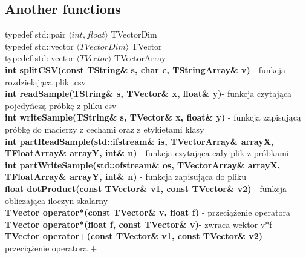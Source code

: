 \documentclass[11pt]{article}
\begin{document}
\subsection{Another functions}
typedef std::pair $\langle int, float \rangle$ TVectorDim\\
typedef std::vector $\langle TVectorDim \rangle$ TVector\\
typedef std::vector $\langle TVector \rangle$ TVectorArray\\
\textbf{int splitCSV(const TString\& s, char c, TStringArray\& v)} - funkcja rozdzielająca plik .csv\\
\textbf{int readSample(TString\& s, TVector\& x, float\& y)}- funkcja czytająca pojedyńczą próbkę z pliku csv\\
\textbf{int writeSample(TString\& s, TVector\& x, float\& y)} - funkcja zapisującą próbkę do macierzy z cechami oraz z etykietami klasy\\
\textbf{int partReadSample(std::ifstream\& is, TVectorArray\& arrayX, TFloatArray\& arrayY, int\& n) }- funkcja czytająca cały plik z próbkami\\
\textbf{int partWriteSample(std::ofstream\& os, TVectorArray\& arrayX, TFloatArray\& arrayY, int\& n)} - funkcja zapisująca do pliku\\
\textbf{float dotProduct(const TVector\& v1, const TVector\& v2)} - funkcja obliczająca iloczyn skalarny\\
\textbf{TVector operator*(const TVector\& v, float f) }- przeciążenie operatora 
\textbf{TVector operator*(float f, const TVector\& v)}- zwraca wektor v*f\\
\textbf{TVector operator+(const TVector\& v1, const TVector\& v2) }- przeciążenie operatora +\\
\end{document}
